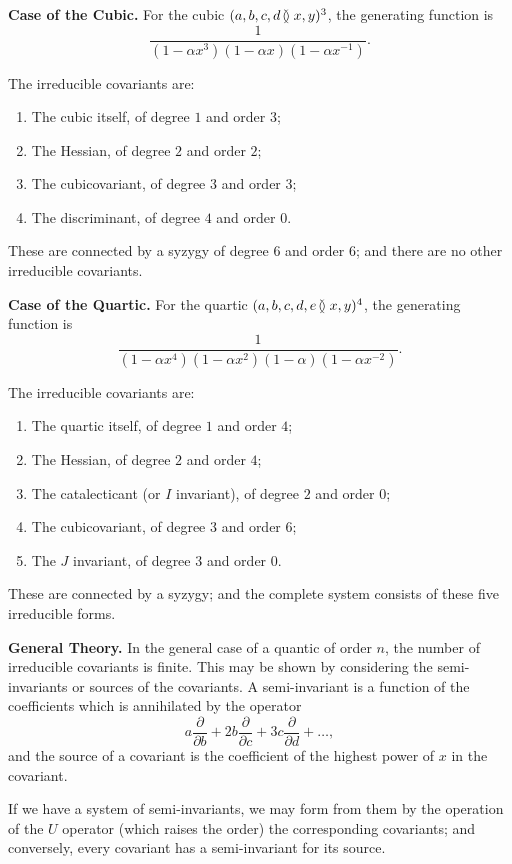 \documentclass[12pt,a4paper]{article}
\begin{document}
\textbf{Case of the Cubic.} For the cubic $(a,b,c,d \mspace{-2mu}\between x,y)^3$, the generating
function is
%
\[
\frac{1}{(1-\alpha x^3)(1-\alpha x)(1-\alpha x^{-1})}.
\]

The irreducible covariants are:
\begin{enumerate}[label=(\arabic*)]
\item The cubic itself, of degree $1$ and order $3$;
\item The Hessian, of degree $2$ and order $2$;
\item The cubicovariant, of degree $3$ and order $3$;
\item The discriminant, of degree $4$ and order $0$.
\end{enumerate}

These are connected by a syzygy of degree $6$ and order $6$; and there are
no other irreducible covariants.

\textbf{Case of the Quartic.} For the quartic $(a,b,c,d,e \mspace{-2mu}\between x,y)^4$, the
generating function is
%
\[
\frac{1}{(1-\alpha x^4)(1-\alpha x^2)(1-\alpha)(1-\alpha x^{-2})}.
\]

The irreducible covariants are:
\begin{enumerate}[label=(\arabic*)]
\item The quartic itself, of degree $1$ and order $4$;
\item The Hessian, of degree $2$ and order $4$;
\item The catalecticant (or $I$ invariant), of degree $2$ and order $0$;
\item The cubicovariant, of degree $3$ and order $6$;
\item The $J$ invariant, of degree $3$ and order $0$.
\end{enumerate}

These are connected by a syzygy; and the complete system consists of these
five irreducible forms.

\textbf{General Theory.} In the general case of a quantic of order $n$, the number
of irreducible covariants is finite. This may be shown by considering the
semi-invariants or sources of the covariants. A semi-invariant is a function
of the coefficients which is annihilated by the operator
%
\[
a \frac{\partial}{\partial b} + 2b \frac{\partial}{\partial c} + 3c \frac{\partial}{\partial d} + \ldots,
\]
%
and the source of a covariant is the coefficient of the highest power of $x$
in the covariant.

If we have a system of semi-invariants, we may form from them by the
operation of the $U$ operator (which raises the order) the corresponding
covariants; and conversely, every covariant has a semi-invariant for its
source.
\end{document}
